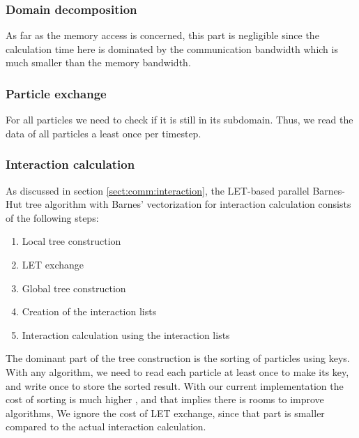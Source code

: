 \subsubsection{Domain decomposition}

As far as the memory access is concerned, this part is negligible
since the calculation time here is dominated by the communication
bandwidth which is much smaller than the memory bandwidth.

\subsubsection{Particle exchange}

For all particles we need to check if it is still in its
subdomain. Thus, we read the data of all particles a least once per
timestep.

\subsubsection{Interaction calculation}


As discussed in section \ref{sect:comm:interaction}, the LET-based
parallel Barnes-Hut tree algorithm with Barnes' vectorization for
interaction calculation consists of the following steps:

\begin{enumerate}

\item Local tree construction
\item LET exchange
\item Global tree construction
\item Creation of the interaction lists
\item Interaction calculation using the interaction lists  
\end{enumerate}  

The dominant part of the tree construction is the sorting of particles
using keys. With any algorithm, we need to read  each particle at
least once to make its key, and write once to store the sorted result.
With our current implementation the cost of sorting is much higher
\cite{v2plus}, and that implies there is rooms to improve algorithms,
We ignore the cost of LET exchange, since that part is smaller
compared to the actual interaction calculation.


